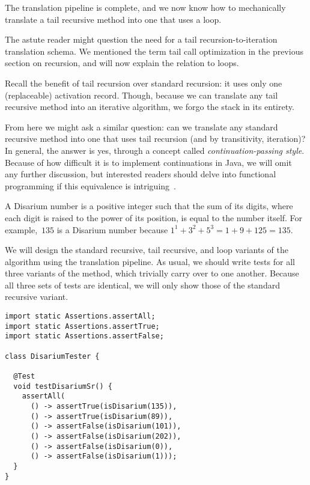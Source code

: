 The translation pipeline is complete, and we now know how to mechanically translate a tail recursive method into one that uses a loop.

The astute reader might question the need for a tail recursion-to-iteration translation schema. 
We mentioned the term tail call optimization in the previous section on recursion, and will now explain the relation to loops.

Recall the benefit of tail recursion over standard recursion: it uses only one (replaceable) activation record. 
Though, because we can translate any tail recursive method into an iterative algorithm, we forgo the stack in its entirety.

From here we might ask a similar question: can we translate any standard recursive method into one that uses tail recursion (and by transitivity, iteration)? 
In general, the answer is yes, through a concept called \emph{continuation-passing style}. 
Because of how difficult it is to implement continuations in Java, we will omit any further discussion, but interested readers should delve into functional programming if this equivalence is intriguing~\citep{eopl, tls, schemetlp}.

A Disarium number is a positive integer such that the sum of its digits, where each digit is raised to the power of its position, is equal to the number itself.
For example,~$135$ is a Disarium number because $1^1+3^2+5^3 = 1+9+125=135$. 

We will design the standard recursive, tail recursive, and loop variants of the algorithm using the translation pipeline.
As usual, we should write tests for all three variants of the method, which trivially carry over to one another.
Because all three sets of tests are identical, we will only show those of the standard recursive variant.

\enlargethispage{2\baselineskip}
\begin{lstlisting}[language=MyJava]
import static Assertions.assertAll;
import static Assertions.assertTrue;
import static Assertions.assertFalse;

class DisariumTester {

  @Test
  void testDisariumSr() {
    assertAll(
      () -> assertTrue(isDisarium(135)),
      () -> assertTrue(isDisarium(89)),
      () -> assertFalse(isDisarium(101)),
      () -> assertFalse(isDisarium(202)),
      () -> assertFalse(isDisarium(0)),
      () -> assertFalse(isDisarium(1)));
  }
}
\end{lstlisting}

